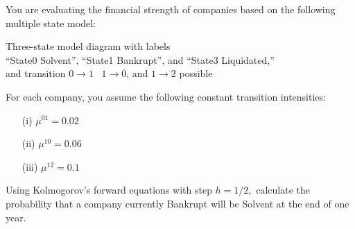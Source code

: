 You are evaluating the financial strength of companies based on the following multiple state model:
\begin{center}
  Three-state model diagram with labels \\``State0 Solvent'', ``State1 Bankrupt'', and ``State3 Liquidated,''
  \\ and transition $0\rightarrow 1$  \ $1\rightarrow 0$, and $1 \rightarrow 2$ possible
\end{center}
For each company, you assume the following constant transition intensities:
\begin{itemize}
\item[(i)]  $\mu^{01} = 0.02$ 
\item[(ii)]  $\mu^{10} = 0.06$ 
\item[(iii)]   $\mu^{12} = 0.1$ 
\end{itemize}
Using Kolmogorov's forward equations with step $h=1/2,$ 
calculate the probability that a company currently Bankrupt will be Solvent at the end of one year.
